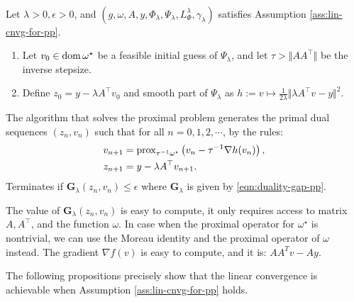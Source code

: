 \documentclass[12pt]{article}
\begin{document}
        \begin{definition}\;\label{def:ista-inner-lp}\\
            Let $\lambda > 0, \epsilon > 0$, and $(g, \omega, A, y, \Phi_\lambda, \Psi_\lambda, L^\lambda_{\Phi} ,\gamma_\lambda)$ satisfies Assumption \ref{ass:lin-cnvg-for-pp}. 
            \begin{enumerate}[nosep]
                \item Let $v_0\in\operatorname{dom} \omega^\star$ be a feasible initial guess of $\Psi_{\lambda}$, and let $\tau > \Vert AA^\top\Vert$ be the inverse stepsize. 
                \item Define $z_0 = y - \lambda A^\top v_0$ and smooth part of $\Psi_\lambda$ as $h := v \mapsto \frac{1}{2\lambda}\Vert \lambda A^\top v - y\Vert^2$. 
            \end{enumerate}
            The algorithm that solves the proximal problem generates the primal dual sequences $(z_n, v_n)$ such that for all $n = 0, 1, 2, \cdots$, by the rules: 
            \begin{align*}
                v_{n + 1} &= \operatorname{prox}_{\tau^{-1} \omega^\star}\left(
                    v_{n} - \tau^{-1}\nabla h(v_n)
                \right), 
                \\
                z_{n + 1} &= y - \lambda A^\top v_{n + 1}. 
            \end{align*}
            Terminates if $\mathbf G_\lambda(z_n, v_n) \le \epsilon$ where $\mathbf G_\lambda$ is given by \eqref{eqn:duality-gap-pp}. 
        \end{definition}
        \begin{remark}
            The value of $\mathbf G_\lambda(z_n, v_n)$ is easy to compute, it only requires access to matrix $A, A^\top$, and the function $\omega$. 
            In case when the proximal operator for $\omega^\star$ is nontrivial, we can use the Moreau identity and the proximal operator of $\omega$ instead. 
            The gradient $\nabla f(v)$ is easy to compute, and it is: $AA^T v - Ay$.
        \end{remark}
        \par
        The following propositions precisely show that the linear convergence is achievable when Assumption \ref{ass:lin-cnvg-for-pp} holds. 
\end{document}
